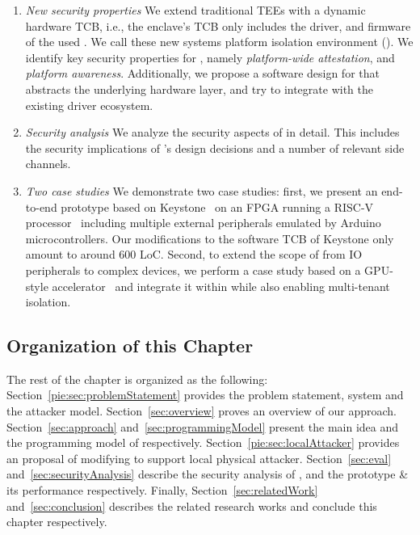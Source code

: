 \begin{enumerate}
  \item \emph{New security properties} We extend traditional TEEs with a dynamic hardware TCB, i.e., the enclave's TCB only includes the driver, and firmware of the used \sphw. We call these new systems platform isolation environment (\name{}). We identify key security properties for \name{}, namely \emph{platform-wide attestation}, and \emph{platform awareness}. Additionally, we propose a software design for \name that abstracts the underlying hardware layer, and try to integrate with the existing driver ecosystem. 
  
  \item \emph{Security analysis} We analyze the security aspects of \name in detail. This includes the security implications of \name{}'s design decisions and a number of relevant side channels.
  
  \item \emph{Two case studies} We demonstrate two case studies: first, we present an end-to-end prototype based on Keystone~\cite{keystone} on an FPGA running a RISC-V processor~\cite{ariane} including multiple external peripherals emulated by Arduino microcontrollers. Our modifications to the software TCB of Keystone only amount to around 600 LoC. Second, to extend the scope of \name from IO peripherals to complex devices, we perform a case study based on a GPU-style accelerator~\cite{zaruba2020manticore} and integrate it within \name{} while also enabling multi-tenant isolation.

\end{enumerate}


\subsection{Organization of this Chapter}

The rest of the chapter is organized as the following: Section~\ref{pie:sec:problemStatement} provides the problem statement, system and the attacker model. Section~\ref{sec:overview} proves an overview of our approach. Section~\ref{sec:approach} and~\ref{sec:programmingModel} present the main idea and the programming model of \name respectively. Section~\ref{pie:sec:localAttacker} provides an proposal of modifying \name to support local physical attacker. Section~\ref{sec:eval} and~\ref{sec:securityAnalysis} describe the security analysis of \name, and  the \name prototype \& its performance respectively. Finally, Section~\ref{sec:relatedWork} and~\ref{sec:conclusion} describes the related research works and conclude this chapter respectively. 